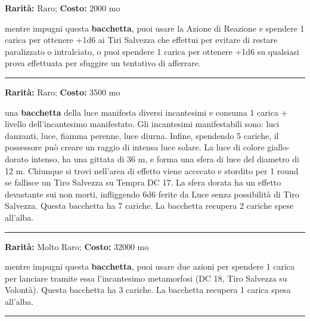 \begin{multicols}{2}
\textbf{Rarità:} Raro; \textbf{Costo:} 2000 mo

mentre impugni questa \textbf{bacchetta}, puoi usare la Azione di Reazione e spendere 1 carica per ottenere +1d6 ai Tiri Salvezza che effettui per evitare di restare paralizzato o intralciato, o puoi spendere 1 carica per ottenere +1d6 su qualsiasi prova effettuata per sfuggire un tentativo di afferrare.

\smallskip\noindent\rule{\linewidth}{2pt}  \hypertarget{BacchettadellaLuce}{}\smallskip{}\noindent\label{BacchettadellaLuce}

\textbf{Rarità:} Raro; \textbf{Costo:} 3500 mo

una \textbf{bacchetta} della luce manifesta diversi incantesimi e consuma 1 carica + livello dell'incantesimo manifestato. Gli incantesimi manifestabili sono: luci danzanti, luce, fiamma perenne, luce diurna. Infine, spendendo 5 cariche, il possessore può creare un raggio di intensa luce solare. La luce di colore giallo-dorato intenso, ha una gittata di 36 m, e forma una sfera di luce del diametro di 12 m. Chiunque si trovi nell'area di effetto viene accecato e stordito per 1 round se fallisce un Tiro Salvezza su Tempra DC 17. La sfera dorata ha un effetto devastante sui non morti, infliggendo 6d6 ferite da Luce senza possibilità di Tiro Salvezza. Questa bacchetta ha 7 cariche. La bacchetta recupera 2 cariche spese all'alba.

\smallskip\noindent\rule{\linewidth}{2pt}  \hypertarget{BacchettadellaMetamorfosi}{}\smallskip{}\noindent\label{BacchettadellaMetamorfosi}

\textbf{Rarità:} Molto Raro; \textbf{Costo:} 32000 mo

mentre impugni questa \textbf{bacchetta}, puoi usare due azioni per spendere 1 carica per lanciare tramite essa l'incantesimo metamorfosi (DC 18, Tiro Salvezza su Volontà). Questa bacchetta ha 3 cariche. La bacchetta recupera 1 carica spesa all'alba.

\smallskip\noindent\rule{\linewidth}{2pt}  \hypertarget{BacchettadellaNegazione}{}\smallskip{}\noindent\label{BacchettadellaNegazione}


\end{multicols}
